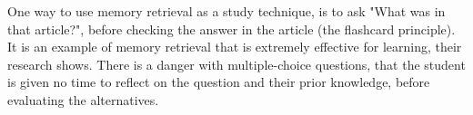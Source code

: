  One way to use memory retrieval as a study technique, is to ask "What was in that article?", before checking the answer in the article (the flashcard principle). It is an example of memory retrieval that is extremely effective for learning, their research shows. There is a danger with multiple-choice questions, that the student is given no time to reflect on the question and their prior knowledge, before evaluating the alternatives.





%
